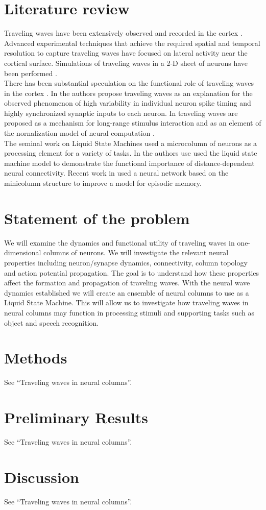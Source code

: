 \documentclass[a4paper,11pt]{article}
\begin{document}
\section{Literature review}
Traveling waves have been extensively observed and recorded in the cortex \cite{sato2012} \cite{wu2008} \cite{muller2018}.
Advanced experimental techniques that achieve the required spatial and temporal resolution \cite{shoham1999}\cite{wu2008} to capture traveling waves have focused on lateral activity near the cortical surface.
Simulations of traveling waves in a 2-D sheet of neurons have been performed \cite{keane2015}. 
\\
There has been substantial speculation on the functional role of traveling waves in the cortex \cite{muller2018}\cite{sato2012}.
In \cite{keane2015} the authors propose traveling waves as an explanation for the observed phenomenon of high variability in individual neuron spike timing and highly synchronized synaptic inputs to each neuron.
In \cite{sato2012} traveling waves are proposed as a mechanism for long-range stimulus interaction and as an element of the nornalization model of neural computation \cite{carandini2012}.
\\
The seminal work on Liquid State Machines \cite{maas2002} used a microcolumn of neurons as a processing element for a variety of tasks.
In \cite{pyle2017} the authors use used the liquid state machine model to demonstrate the functional importance of distance-dependent neural connectivity. 
Recent work in \cite{basawaraj2019} used a neural network based on the minicolumn structure to improve a model for episodic memory.

\section{Statement of the problem}
We will examine the dynamics and functional utility of traveling waves in one-dimensional columns of neurons.
We will investigate the relevant neural properties including neuron/synapse dynamics, connectivity, column topology and action potential propagation.
The goal is to understand how these properties affect the formation and propagation of traveling waves.
With the neural wave dynamics established we will create an ensemble of neural columns to use as a Liquid State Machine\cite{maas2002}.
This will allow us to investigate how traveling waves in neural columns may function in processing stimuli and supporting tasks such as object and speech recognition.

\section{Methods}
See ``Traveling waves in neural columns''.


\section{Preliminary Results}
See ``Traveling waves in neural columns''.


\section{Discussion}
See ``Traveling waves in neural columns''.


\clearpage
\printbibliography
\end{document}
